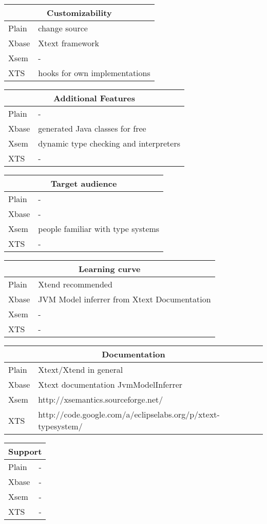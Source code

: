 \begin{frame}
\begin{tabularx}{\linewidth}{ l   X }
\multicolumn{2}{c}{Customizability} \\ \hline
Plain & change source \\
Xbase & Xtext framework \\
Xsem & - \\
XTS & hooks for own implementations \\
\end{tabularx}

\begin{tabularx}{\linewidth}{ l   X }
\multicolumn{2}{c}{Additional Features} \\ \hline
Plain & - \\
Xbase & generated Java classes for free \\
Xsem & dynamic type checking and interpreters \\
XTS & - \\
\end{tabularx}

\begin{tabularx}{\linewidth}{ l   X }
\multicolumn{2}{c}{Target audience} \\ \hline
Plain & - \\
Xbase & - \\
Xsem & people familiar with type systems \\
XTS & - \\
\end{tabularx}

\begin{tabularx}{\linewidth}{ l   X }
\multicolumn{2}{c}{Learning curve} \\ \hline
Plain & Xtend recommended \\
Xbase & JVM Model inferrer from Xtext Documentation \\
Xsem & - \\
XTS & - \\
\end{tabularx}

\begin{tabularx}{\linewidth}{ l   X }
\multicolumn{2}{c}{Documentation} \\ \hline
Plain & Xtext/Xtend in general \\
Xbase & Xtext documentation JvmModelInferrer \\
Xsem & http://xsemantics.sourceforge.net/ \\
XTS & http://code.google.com/a/eclipselabs.org/p/xtext-typesystem/ \\
\end{tabularx}

\begin{tabularx}{\linewidth}{ l   X }
\multicolumn{2}{c}{Support} \\ \hline
Plain & - \\
Xbase & - \\
Xsem & - \\
XTS & - \\
\end{tabularx}
  
\end{frame}
